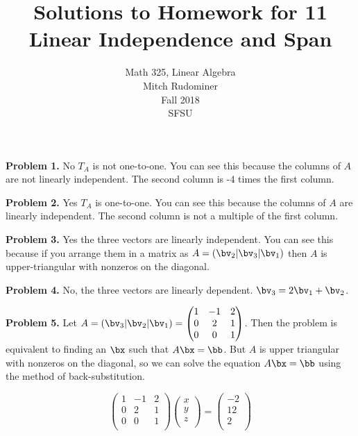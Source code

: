 \documentclass[oneside,12pt]{amsart}
\begin{document}
\title{Solutions to Homework for 11 \\ Linear Independence and Span}
\author{Math 325, Linear Algebra \\ Mitch Rudominer \\ Fall 2018 \\ SFSU }
\date{}

\maketitle


\textbf{Problem 1.} No $T_A$ is not one-to-one. You can see this because
the columns of $A$ are not linearly independent. The second column is
-4 times the first column.

\bigskip

\textbf{Problem 2.} Yes $T_A$ is one-to-one. You can see this because
the columns of $A$ are linearly independent. The second column is
not a multiple of the first column.

\bigskip

\textbf{Problem 3.} Yes the three vectors are linearly independent. You can
see this because if you arrange them in a matrix as
$A = (\bv_2 \vert \bv_3 \vert \bv_1)$ then $A$ is upper-triangular with
nonzeros on the diagonal.

\bigskip

\textbf{Problem 4.} No, the three vectors are linearly dependent.
$\bv_3 = 2\bv_1 + \bv_2$.

\bigskip

\textbf{Problem 5.} Let
$A = \left(\bv_3 \vert \bv_2 \vert \bv_1 \right) =
\begin{pmatrix}
1 & -1 & 2\\
0 &  2 & 1 \\
0 &  0 & 1  \\
\end{pmatrix}
$.
Then the problem is equivalent to finding an $\bx$ such that $A\bx=\bb$.
But $A$ is upper triangular with nonzeros on the diagonal, so we can
solve the equation $A\bx=\bb$ using the method of back-substitution.

$$
\begin{pmatrix}
1 & -1 & 2 \\
0 &  2 & 1 \\
0 &  0 & 1  \\
\end{pmatrix}
\begin{pmatrix}
x \\
y \\
z \\
\end{pmatrix}
=
\begin{pmatrix}
-2 \\
12 \\
2 \\
\end{pmatrix}
$$
\end{document}
